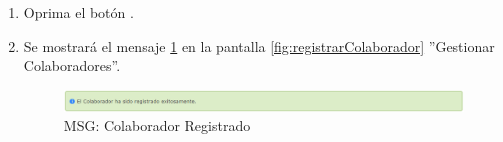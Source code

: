 \begin{enumerate}
			\item Oprima el botón \IUAceptar.
			
			\item Se mostrará el mensaje \ref{fig:colaboradorRegistrado} en la pantalla \ref{fig:registrarColaborador} ''Gestionar Colaboradores''.
			
			\begin{figure}[htbp!]
				\begin{center}
					\includegraphics[scale=0.6]{roles/administrador/colaboradores/gestionarColaboradores/pantallas/IU3-1MSG1}
					\caption{MSG: Colaborador Registrado}
					\label{fig:colaboradorRegistrado}
				\end{center}
			\end{figure}
			\end{enumerate}